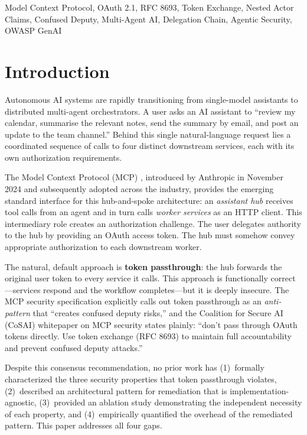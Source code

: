 \documentclass[journal]{IEEEtran}
\begin{document}
\begin{IEEEkeywords}
Model Context Protocol, OAuth 2.1, RFC 8693, Token Exchange, Nested Actor Claims,
Confused Deputy, Multi-Agent AI, Delegation Chain, Agentic Security, OWASP GenAI
\end{IEEEkeywords}


\section{Introduction}
\label{sec:introduction}

Autonomous AI systems are rapidly transitioning from single-model assistants to
distributed multi-agent orchestrators. A user asks an AI assistant to
``review my calendar, summarise the relevant notes, send the summary by email, and
post an update to the team channel.'' Behind this single natural-language request
lies a coordinated sequence of calls to four distinct downstream services, each
with its own authorization requirements.

The Model Context Protocol (MCP) \cite{mcp_spec}, introduced by Anthropic in
November 2024 and subsequently adopted across the industry, provides the emerging
standard interface for this hub-and-spoke architecture: an \textit{assistant hub}
receives tool calls from an agent and in turn calls \textit{worker services} as an
HTTP client. This intermediary role creates an authorization challenge. The user
delegates authority to the hub by providing an OAuth access token. The hub must
somehow convey appropriate authorization to each downstream worker.

The natural, default approach is \textbf{token passthrough}: the hub forwards the
original user token to every service it calls. This approach is functionally
correct---services respond and the workflow completes---but it is deeply
insecure. The MCP security specification \cite{mcp_security} explicitly calls out
token passthrough as an \textit{anti-pattern} that ``creates confused deputy
risks,'' and the Coalition for Secure AI (CoSAI) whitepaper on MCP security
\cite{cosai_mcp} states plainly: ``don't pass through OAuth tokens directly. Use
token exchange (RFC 8693) to maintain full accountability and prevent confused
deputy attacks.''

Despite this consensus recommendation, no prior work has (1)~formally
characterized the three security properties that token passthrough violates,
(2)~described an architectural pattern for remediation that is
implementation-agnostic, (3)~provided an ablation study demonstrating the
independent necessity of each property, and (4)~empirically quantified the
overhead of the remediated pattern. This paper addresses all four gaps.
\end{document}
